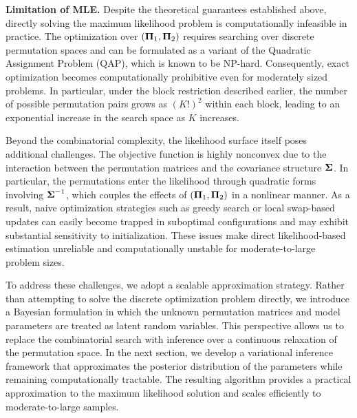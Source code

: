 \documentclass[numsec,webpdf,modern,medium,namedate]{oup-authoring-template}
\theoremstyle{thmstyleone}%
\theoremstyle{thmstyletwo}%
\theoremstyle{thmstylethree}%
\begin{document}
\textbf{Limitation of MLE.} Despite the theoretical guarantees established above, directly solving the maximum likelihood problem is computationally infeasible in practice. The optimization over $(\boldsymbol{\Pi}_1,\boldsymbol{\Pi}_2)$ requires searching over discrete permutation spaces and can be formulated as a variant of the Quadratic Assignment Problem (QAP), which is known to be NP-hard. Consequently, exact optimization becomes computationally prohibitive even for moderately sized problems. In particular, under the block restriction described earlier, the number of possible permutation pairs grows as $(K!)^2$ within each block, leading to an exponential increase in the search space as $K$ increases.

Beyond the combinatorial complexity, the likelihood surface itself poses additional challenges. The objective function is highly nonconvex due to the interaction between the permutation matrices and the covariance structure $\boldsymbol{\Sigma}$. In particular, the permutations enter the likelihood through quadratic forms involving $\boldsymbol{\Sigma}^{-1}$, which couples the effects of $(\boldsymbol{\Pi}_1,\boldsymbol{\Pi}_2)$ in a nonlinear manner. As a result, naive optimization strategies such as greedy search or local swap-based updates can easily become trapped in suboptimal configurations and may exhibit substantial sensitivity to initialization. These issues make direct likelihood-based estimation unreliable and computationally unstable for moderate-to-large problem sizes.

To address these challenges, we adopt a scalable approximation strategy. Rather than attempting to solve the discrete optimization problem directly, we introduce a Bayesian formulation in which the unknown permutation matrices and model parameters are treated as latent random variables. This perspective allows us to replace the combinatorial search with inference over a continuous relaxation of the permutation space. In the next section, we develop a variational inference framework that approximates the posterior distribution of the parameters while remaining computationally tractable. The resulting algorithm provides a practical approximation to the maximum likelihood solution and scales efficiently to moderate-to-large samples.
\end{document}
